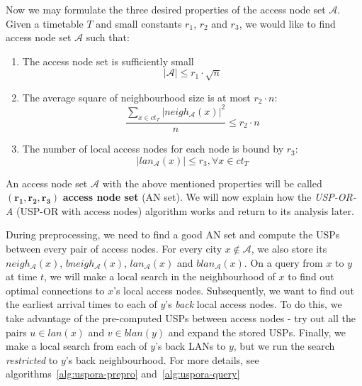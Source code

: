     \noindent Now we may formulate the three desired properties of the access node set $\mathcal{A}$. Given a timetable $T$ and small constants $r_{1}$, $r_{2}$ and $r_{3}$, we would like to find access node set $\mathcal{A}$ such that:
    \begin{enumerate}
		\item The access node set is sufficiently small \\
		\begin{equation}
			|\mathcal{A}| \leq r_{1} \cdot \sqrt{n}
		\end{equation}
		\item The average square of neighbourhood size is at most $r_{2} \cdot n$: \\
		\begin{equation}
			\frac{\displaystyle \sum_{x \in ct_{T}}|neigh_{\mathcal{A}}(x)|^{2}}{\displaystyle n} \leq r_{2} \cdot n
		\end{equation}
		\item The number of local access nodes for each node is bound by $r_{3}$: \\
		\begin{equation}
			|lan_{\mathcal{A}}(x)| \leq r_{3}, \forall x \in ct_{T}
		\end{equation}
	\end{enumerate}
	\hspace{\fill}
	
	\noindent An access node set $\mathcal{A}$ with the above mentioned properties will be called $\bm{(r_{1}, r_{2}, r_{3})}$ \textbf{access node set} (AN set). We will now explain how the \textit{USP-OR-A} (USP-OR with access nodes) algorithm works and return to its analysis later. 
	
	During preprocessing, we need to find a good AN set and compute the USPs between every pair of access nodes. For every city $x \not \in \mathcal{A}$, we also store its $neigh_{\mathcal{A}}(x)$, $bneigh_{\mathcal{A}}(x)$, $lan_{\mathcal{A}}(x)$ and $blan_{\mathcal{A}}(x)$. On a query from $x$ to $y$ at time $t$, we will make a local search in the neighbourhood of $x$ to find out optimal connections to $x$'s local access nodes. Subsequently, we want to find out the earliest arrival times to each of $y$'s \textit{back} local access nodes. To do this, we take advantage of the pre-computed USPs between access nodes - try out all the pairs $u \in lan(x)$ and $v \in blan(y)$ and expand the stored USPs. Finally, we make a local search from each of $y$'s back LANs to $y$, but we run the search \textit{restricted} to $y$'s back neighbourhood. For more details, see algorithms~\ref{alg:uspora-prepro} and~\ref{alg:uspora-query} 
	
